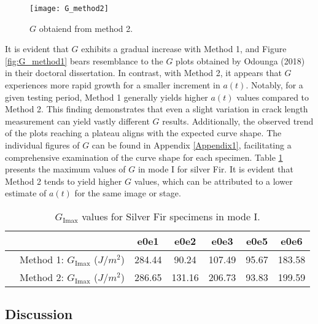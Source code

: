 \begin{figure}[htp]
	\centering
	\texttt{[image: G\_method2]}
	\caption{$G$ obtaiend from method 2.}
	\label{fig:G_method2}
\end{figure}

It is evident that $G$ exhibits a gradual increase with Method 1, and Figure \ref{fig:G_method1} bears resemblance to the $G$ plots obtained by Odounga (2018) in their doctoral dissertation. In contrast, with Method 2, it appears that $G$ experiences more rapid growth for a smaller increment in $a(t)$. Notably, for a given testing period, Method 1 generally yields higher $a(t)$ values compared to Method 2. This finding demonstrates that even a slight variation in crack length measurement can yield vastly different $G$ results. Additionally, the observed trend of the plots reaching a plateau aligns with the expected curve shape.
The individual figures of $G$ can be found in Appendix \ref{Appendix1}, facilitating a comprehensive examination of the curve shape for each specimen.
Table \ref{fig:tableG1} presents the maximum values of $G$ in mode I for silver Fir. It is evident that Method 2 tends to yield higher $G$ values, which can be attributed to a lower estimate of $a(t)$ for the same image or stage.

\begin{table} [H]
	\centering
	\begin{tabular}{ccccccc}
		\toprule %
		&  & e0e1 & e0e2 & e0e3 & e0e5 & e0e6\\\midrule
		& Method 1: $G_\text{Imax}$ ($J/m^2$) & 284.44 & 90.24 & 107.49 & 95.67 & 183.58 \\
		& Method 2: $G_\text{Imax}$ ($J/m^2$) & 286.65 & 131.16 & 206.73 & 93.83 & 199.59 \\\bottomrule
	\end{tabular}
	\caption{$G_\text{Imax}$ values for Silver Fir specimens in mode I.}
	\label{fig:tableG1}
\end{table}

\subsection{Discussion}

